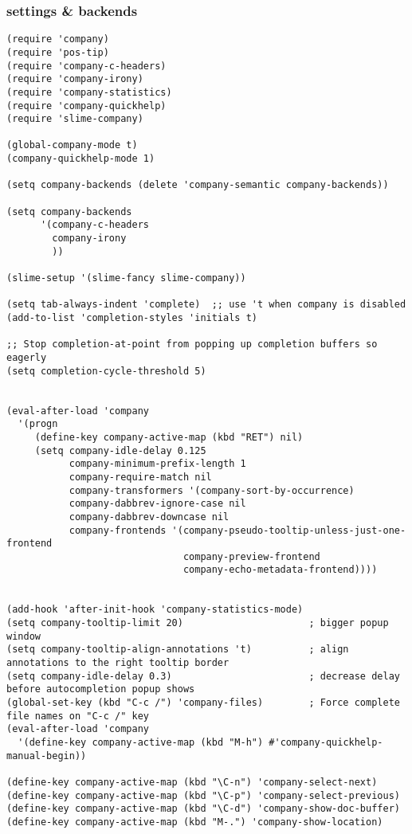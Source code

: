 \documentclass[11pt]{article}
\begin{document}
\subsubsection{settings \& backends}
\label{sec-2-21-1}
\begin{verbatim}
(require 'company)
(require 'pos-tip)
(require 'company-c-headers)
(require 'company-irony)
(require 'company-statistics)
(require 'company-quickhelp)
(require 'slime-company)

(global-company-mode t)
(company-quickhelp-mode 1)

(setq company-backends (delete 'company-semantic company-backends))

(setq company-backends
      '(company-c-headers
        company-irony
        ))

(slime-setup '(slime-fancy slime-company))

(setq tab-always-indent 'complete)  ;; use 't when company is disabled
(add-to-list 'completion-styles 'initials t)

;; Stop completion-at-point from popping up completion buffers so eagerly
(setq completion-cycle-threshold 5)


(eval-after-load 'company
  '(progn
     (define-key company-active-map (kbd "RET") nil)
     (setq company-idle-delay 0.125
           company-minimum-prefix-length 1
           company-require-match nil
           company-transformers '(company-sort-by-occurrence)
           company-dabbrev-ignore-case nil
           company-dabbrev-downcase nil
           company-frontends '(company-pseudo-tooltip-unless-just-one-frontend
                               company-preview-frontend
                               company-echo-metadata-frontend))))


(add-hook 'after-init-hook 'company-statistics-mode)
(setq company-tooltip-limit 20)                      ; bigger popup window
(setq company-tooltip-align-annotations 't)          ; align annotations to the right tooltip border
(setq company-idle-delay 0.3)                        ; decrease delay before autocompletion popup shows
(global-set-key (kbd "C-c /") 'company-files)        ; Force complete file names on "C-c /" key
(eval-after-load 'company
  '(define-key company-active-map (kbd "M-h") #'company-quickhelp-manual-begin))

(define-key company-active-map (kbd "\C-n") 'company-select-next)
(define-key company-active-map (kbd "\C-p") 'company-select-previous)
(define-key company-active-map (kbd "\C-d") 'company-show-doc-buffer)
(define-key company-active-map (kbd "M-.") 'company-show-location)
\end{verbatim}
\end{document}
